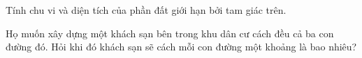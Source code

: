 \begin{exercises}
\begin{questions}[resume=SGK]
        \begin{questions}
            \item Tính chu vi và diện tích của phần đất giới hạn bởi tam giác trên.

            \answerline
            \answerline
            \answerline
            \item Họ muốn xây dựng một khách sạn bên trong khu dân cư cách đều cả ba con đường đó. Hỏi khi đó khách sạn sẽ cách mỗi con đường một khoảng là bao nhiêu?

            \answerline
            \answerline
            \answerline
        \end{questions}
    \end{questions}
\end{exercises}
